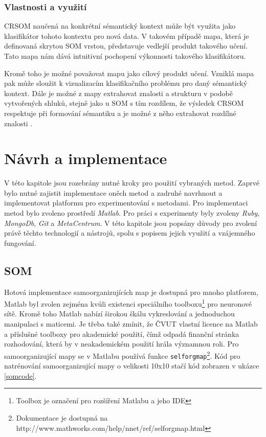 \documentclass[thesis=M,czech]{FITthesis}[2012/06/26]
\begin{document}
\subsection{Vlastnosti a využití}

	CRSOM naučená na konkrétní sémantický kontext může být využita jako klasifikátor tohoto kontextu pro nová data. V takovém případě mapa, která je definovaná skrytou SOM vrstou, představuje vedlejší produkt takového učení. Tato mapa nám dává intuitivní pochopení výkonnosti takového klasifikátoru.

Kromě toho je možné považovat mapu jako cílový produkt učení. Vzniklá mapa pak může sloužit k vizualizacím klasifikačního problému pro daný sémantický kontext. Dále je možné z mapy extrahovat znalosti a strukturu v podobě vytvořených shluků, stejně jako u SOM s tím rozdílem, že výsledek CRSOM respektuje při formování sémantiku a je možné z něho extrahovat rozdílné znalosti \cite{lms}.

\chapter{Návrh a implementace}
V této kapitole jsou rozebrány nutné kroky pro použití vybraných metod. Zaprvé bylo nutné zajistit implementace oněch metod a zadruhé navrhnout a implementovat platformu pro experimentování s metodami. Pro implementaci metod bylo zvoleno prostředí \textit{Matlab}. Pro práci s experimenty byly zvoleny \textit{Ruby}, \textit{MongoDb}, \textit{Git} a \textit{MetaCentrum}. V této kapitole jsou popsány důvody pro zvolení právě těchto technologií a nástrojů, spolu s popisem jejich využití a vzájemného fungování. 


\section{SOM}\label{sec:som_impl}
Hotová implementace samoorganizujících map je dostupná pro mnoho platforem, Matlab byl zvolen zejména kvůli existenci speciálního toolboxu\footnote{Toolbox je označení pro rozšíření Matlabu a jeho IDE} pro neuronové sítě. Kromě toho Matlab nabízí širokou škálu vykreslování a jednoduchou manipulaci s maticemi. Je třeba také zmínit, že ČVUT vlastní licence na Matlab a příslušné toolboxy pro akademické použití, čímž odpadá finanční stránka rozhodování, která by v neakademickém použití hrála významnou roli.
Pro samoorganizující mapy se v Matlabu používá funkce \texttt{selforgmap}\footnote{Dokumentace je dostupná na http://www.mathworks.com/help/nnet/ref/selforgmap.html}. Kód pro natrénování samoorganizující mapy o velikosti 10x10 stačí kód zobrazen v ukázce \ref{somcode}.
\end{document}
